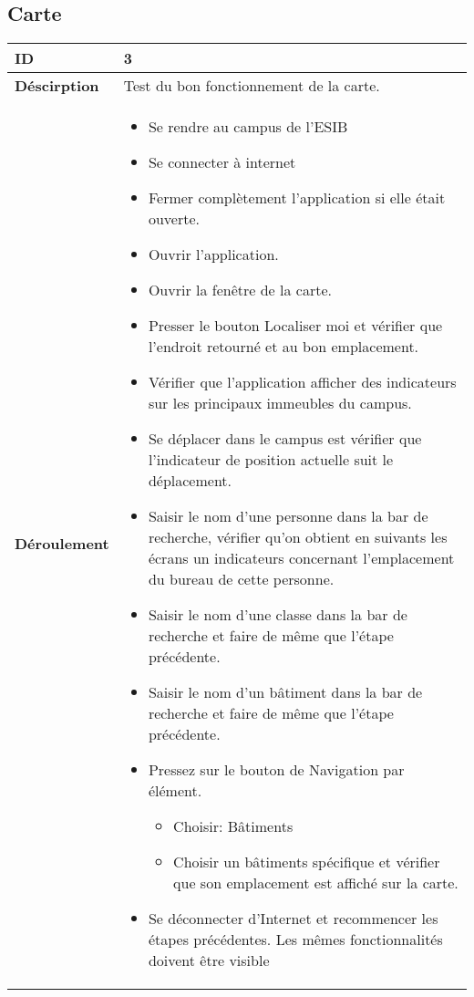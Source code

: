 		\subsection{Carte}
					 \begin{longtable}{m{4cm}|p{10cm}|}
					 \textbf{ ID} & 3 \\
					 \hline \textbf{Déscirption} & Test du bon fonctionnement de la carte.\\
					 \hline \textbf{Déroulement} &
						 \begin{itemize}
						  	\item Se rendre au campus de l'ESIB
						  	\item Se connecter à internet
							 \item Fermer complètement l'application si elle était ouverte.
							 \item Ouvrir l'application.
							 \item Ouvrir la fenêtre de la carte.
							 \item Presser le bouton Localiser moi et vérifier que l'endroit retourné et au bon emplacement.
							 \item Vérifier que l'application afficher des indicateurs sur les principaux immeubles du campus.
							 \item Se déplacer dans  le campus est vérifier que l'indicateur de position actuelle suit le déplacement.
							\item Saisir le nom d'une personne dans la bar de recherche, vérifier qu'on obtient en suivants les écrans un indicateurs concernant l'emplacement du bureau de cette personne.
							\item Saisir le nom d'une classe dans la bar de recherche et faire de même que l'étape précédente.
							\item Saisir le nom d'un bâtiment dans la bar de recherche et faire de même que l'étape précédente.
							\item Pressez sur le bouton de Navigation par élément.
							\begin{itemize}
								\item Choisir: Bâtiments 
								\item Choisir un bâtiments  spécifique et vérifier que son emplacement est affiché sur la carte. 
							\end{itemize}
							\item Se déconnecter d'Internet et recommencer les étapes précédentes. Les mêmes fonctionnalités doivent être visible
						 \end{itemize}
					 \\
				 \end{longtable} 
				 
